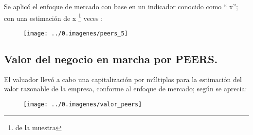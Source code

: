 \newpage

Se aplic\'o el enfoque de mercado con base en un indicador conocido como ``\textcolor{principal}{\peerse} x''; con una estimaci\'on de \textcolor{principal}{\peerseMult x} \footnote{\peerseEst{} de la muestra} veces \peerseTo:\\

\begin{figure}[H]
\centering
\texttt{[image: ../0.imagenes/peers\_5]}
\end{figure}



\subsection{Valor del negocio en marcha por PEERS.} El valuador llev\'o a cabo una capitalizaci\'on por m\'ultiplos para la estimaci\'on del valor razonable de la empresa, conforme al enfoque de mercado; seg\'un se aprecia: 

\begin{figure}[H]
\centering
\texttt{[image: ../0.imagenes/valor\_peers]}\\

\end{figure}